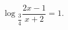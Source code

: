 \begin{ex}[type=equation]
	\begin{condition}
		$\log$\tiny$_{\dfrac{3}{4}}$\normalsize$\dfrac{2x - 1}{x + 2} = 1.$
	\end{condition}
\end{ex}